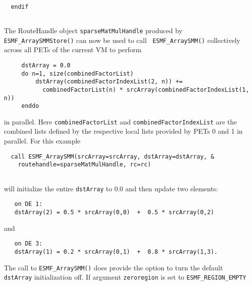 
 \begin{verbatim}
      
  endif
 
\end{verbatim}
 

   The RouteHandle object {\tt sparseMatMulHandle} produced by 
   {\tt ESMF\_ArraySMMStore()} can now be used to call {\tt
   ESMF\_ArraySMM()} collectively across all PETs of the current VM to
   perform
   \begin{verbatim}
     dstArray = 0.0
     do n=1, size(combinedFactorList)
         dstArray(combinedFactorIndexList(2, n)) += 
           combinedFactorList(n) * srcArray(combinedFactorIndexList(1, n))
     enddo
   \end{verbatim}
   in parallel. Here {\tt combinedFactorList} and {\tt combinedFactorIndexList}
   are the combined lists defined by the respective local lists provided by 
   PETs 0 and 1 in parallel. For this example 

 \begin{verbatim}
  call ESMF_ArraySMM(srcArray=srcArray, dstArray=dstArray, &
    routehandle=sparseMatMulHandle, rc=rc)
 
\end{verbatim}
 

   will initialize the entire {\tt dstArray} to 0.0 and then update two elements:
  
   \begin{verbatim}
   on DE 1:
   dstArray(2) = 0.5 * srcArray(0,0)  +  0.5 * srcArray(0,2)
   \end{verbatim}
  
   and
  
   \begin{verbatim}
   on DE 3:
   dstArray(1) = 0.2 * srcArray(0,1)  +  0.8 * srcArray(1,3).
   \end{verbatim}
  
   The call to {\tt ESMF\_ArraySMM()} does provide the option to turn
   the default {\tt dstArray} initialization off. If argument {\tt zeroregion}
   is set to {\tt ESMF\_REGION\_EMPTY} 

